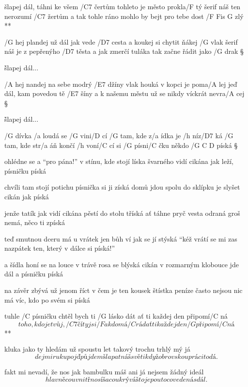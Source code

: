 \R šlapej dál, táhni ke všem /C7 čertům
   tohleto je město prokla/F tý
   šerif náš ten nerozumí /C7 žertům
   a tak tohle ráno mohlo by bejt pro tebe dost /{F Fis G} zlý **

/G hej plandej už dál jak vede /D7 cesta
a koukej si chytit ňákej /G vlak
šerif náš je z pepřenýho /D7 těsta
a jak zmerčí tuláka tak začne řádit jako /G drak \S

\r šlapej dál...

/A hej nandej na sebe modrý /E7 džíny
vlak houká v kopci je poma/A lej
jeď dál, kam povedou tě /E7 šíny
a k našemu městu už se nikdy víckrát nevra/A cej \S

\r šlapej dál...




/G dívka /a loudá se /G vini/D cí
/G tam, kde z/a ídka je /h níz/D7 ká
/G tam, kde str/a áň končí /h voní/C cí
si /G písni/C čku někdo /{G C D} píská \S

ohlédne se a ``pro pána!''
v stínu, kde stojí líska
švarného vidí cikána
jak leží, písničku píská \s

chvíli tam stojí potichu
písnička si ji získá
domů jdou spolu do sklípku
je slyšet cikán jak píská \s

jenže tatík jak vidí cikána
pěstí do stolu tříská
ať táhne pryč vesta odraná
groš nemá, něco ti zpíská \s

teď smutnou dceru má u vrátek
jen bůh ví jak se jí stýská
``kéž vrátí se mi zas nazpátek
ten, který v dálce si píská!''\s

a šídla honí se na louce
v trávě rosa se blýská
cikán v rozmarným klobouce
jde dál a písničku píská \s

na závěr zbývá už jenom říct
v čem je ten kousek štístka
peníze často nejsou nic
má víc, kdo po svém si píská




\R tuhle /C písničku chtěl bych ti /G lásko dát
   ať ti každej den připomí/C ná
   \[ toho, kdo je tvůj, /C7 čí ty jsi /F a kdo má /C rád
   ať ti každej den /G připomí/C ná \]**

kluka jako ty hledám už spoustu let
takový trochu trhlý mý já
\[ dej mi ruku pojď půjdem šlapat náš svět
i když obrovskou práci to dá. \]\s

fakt mi nevadí, že nos jak bambulku máš
ani já nejsem žádný ideál
\[ hlavně co uvnitř nosíš a co ukrýváš
to je pouto co vede nás dál. \]



